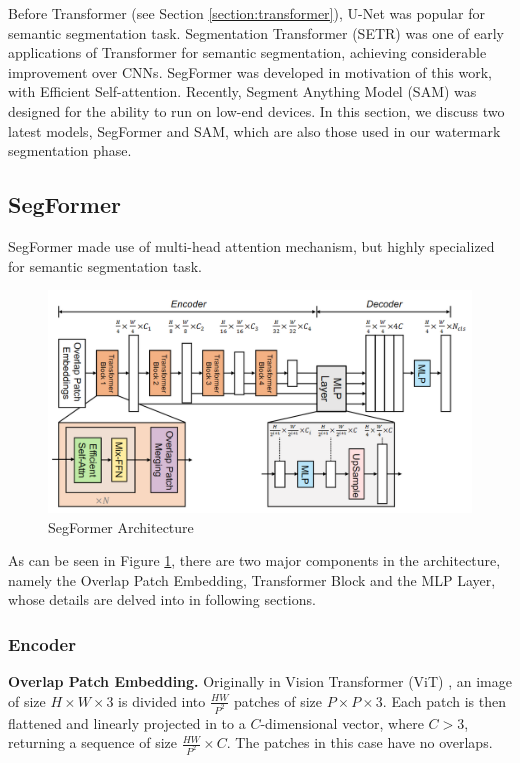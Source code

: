 Before Transformer (see Section \ref{section:transformer}), U-Net \cite{ronneberger2015u} was popular for semantic segmentation task. Segmentation Transformer (SETR) \cite{zheng2021rethinking} was one of early applications of Transformer for semantic segmentation, achieving considerable improvement over CNNs. SegFormer \cite{xie2021segformer} was developed in motivation of this work, with Efficient Self-attention. Recently, Segment Anything Model (SAM) \cite{kirillov2023segment} was designed for the ability to run on low-end devices. In this section, we discuss two latest models, SegFormer and SAM, which are also those used in our watermark segmentation phase.

\subsection{SegFormer}
\label{intro:segformer}
SegFormer made use of multi-head attention mechanism, but highly specialized for semantic segmentation task.

\begin{figure}[ht]
  \centering
  \includegraphics[width=0.7\linewidth]{img/segformer.png}
  \vspace{0.5cm}
  \caption{SegFormer Architecture}
  \label{figure:segFormer-architecture}
\end{figure}

As can be seen in Figure \ref{figure:segFormer-architecture}, there are two major components in the architecture, namely the Overlap Patch Embedding, Transformer Block and the MLP Layer, whose details are delved into in following sections.

\subsubsection{Encoder}

\textbf{Overlap Patch Embedding.} Originally in Vision Transformer (ViT) \cite{dosovitskiy2020image}, an image of size $H\times W\times 3$ is divided into $\frac{HW}{P^2}$ patches of size $P\times P \times 3$. Each patch is then flattened and linearly projected in to a $C$-dimensional vector, where $C>3$, returning a sequence of size $\frac{HW}{P^2}\times C$. The patches in this case have no overlaps.

